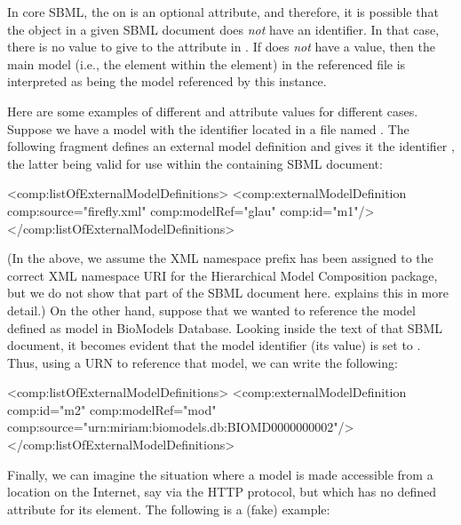 In core SBML, the  on \Model is an optional attribute, and therefore, it is possible that the \Model object in a given SBML document does \emph{not} have an identifier.  In that case, there is no value to give to the  attribute in \ExternalModelDefinition.  If  does \emph{not} have a value, then the main model (i.e., the  element within the  element) in the referenced file is interpreted as being the model referenced by this \ExternalModelDefinition instance.

Here are some examples of different  and   attribute values for different cases.  Suppose we have a model with the identifier  located in a file named .  The following fragment defines an external model definition and gives it the identifier , the latter being valid for use within the containing SBML document:

\begin{example}
<comp:listOfExternalModelDefinitions>
    <comp:externalModelDefinition comp:source="firefly.xml" comp:modelRef="glau" comp:id="m1"/>
</comp:listOfExternalModelDefinitions>
\end{example}

(In the above, we assume the XML namespace prefix  has been assigned to the correct XML namespace URI for the Hierarchical Model Composition package, but we do not show that part of the SBML document here.   explains this in more detail.)  On the other hand, suppose that we wanted to reference the model defined as model  in BioModels Database.  Looking inside the text of that SBML document, it becomes evident that the model identifier (its  value) is set to .  Thus, using a URN to reference that model, we can write the following:

\begin{example}
<comp:listOfExternalModelDefinitions>
    <comp:externalModelDefinition comp:id="m2" comp:modelRef="mod"
                                  comp:source="urn:miriam:biomodels.db:BIOMD0000000002"/>
</comp:listOfExternalModelDefinitions>
\end{example}

Finally, we can imagine the situation where a model is made accessible from a location on the Internet, say via the HTTP protocol, but which has no defined  attribute for its  element. The following is a (fake) example:

